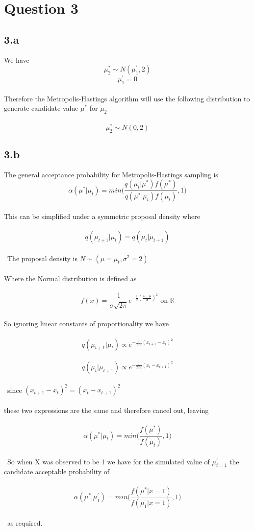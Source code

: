 \documentclass[11pt]{article}   	%
\begin{document}
\break 


\section*{Question 3}

\subsection*{3.a}

We have \
\
\[ \mu^{*}_{2} \sim N(\mu^\prime_1, 2) \]
\[ \mu^\prime_1 = 0 \]
\\
Therefore the Metropolis-Hastings algorithm will use the following distribution to generate candidate value $ \mu^* $ for $ \mu_2 $ \\
\
\[ \mu^{*}_{2} \sim N(0, 2) \]


\subsection*{3.b}

The general acceptance probability for Metropolis-Hastings sampling is \
\\
\[ \alpha(\mu^* | \mu_t) = min \Big( \frac { q(\mu_t | \mu^*) f(\mu^*) } { q(\mu^* | \mu_t) f(\mu_t)}, 1 \Big) \]
\\
This can be simplified under a symmetric proposal density where \\
\
\[ q(\mu_{t + 1} | \mu_t) = q(\mu_t | \mu_{t + 1}) \] \\
\
The proposal density is $ N \sim (\mu = \mu_t, \sigma^2 = 2) $ \\
\\
Where the Normal distribution is defined as \\
\
\[ f(x) = \frac{ 1 }{ \sigma \sqrt{ 2 \pi } } e^{ -\frac{1}{2} ( \frac{x - \mu}{\sigma} )^2 } \text{ on } \mathbb{R} \]
\\
So ignoring linear constants of proportionality we have \\
\
\[ q(\mu_{t + 1} | \mu_t) \propto e^{ - \frac{1}{2x2} (x_{t+1} - x_t)^2 } \]
\
\[ q(\mu_t | \mu_{t + 1}) \propto e^{ - \frac{1}{2x2} (x_t - x_{t + 1} )^2 } \] \\
\
since $ (x_{t+1} - x_t)^2 = (x_t - x_{t + 1} )^2 $ \\
\\
these two expressions are the same and therefore cancel out, leaving \\
\
\[ \alpha(\mu^* | \mu_t) = min \Big( \frac { f(\mu^*) } { f(\mu_t)}, 1 \Big) \] \\
\
So when X was observed to be 1 we have for the simulated value of $ \mu^\prime_{t=1} $ the candidate acceptable probability of \\
\
\[ \alpha(\mu^* | \mu^\prime_1) = min \Big( \frac { f(\mu^* | x = 1) } { f(\mu^\prime_1 | x = 1)}, 1 \Big) \] \\
\
as required.
\end{document}
